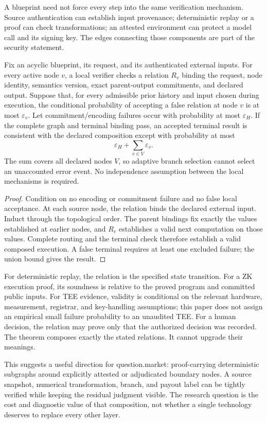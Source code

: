 A blueprint need not force every step into the same verification mechanism. Source authentication can establish input provenance; deterministic replay or a proof can check transformations; an attested environment can protect a model call and its signing key. The edges connecting those components are part of the security statement.

\begin{proposition}
Fix an acyclic blueprint, its request, and its authenticated external inputs. For every active node $v$, a local verifier checks a relation $R_v$ binding the request, node identity, semantics version, exact parent-output commitments, and declared output. Suppose that, for every admissible prior history and input chosen during execution, the conditional probability of accepting a false relation at node $v$ is at most $\varepsilon_v$. Let commitment/encoding failures occur with probability at most $\varepsilon_H$. If the complete graph and terminal binding pass, an accepted terminal result is consistent with the declared composition except with probability at most
\[
\varepsilon_H+\sum_{v\in V}\varepsilon_v.
\]
The sum covers all declared nodes $V$, so adaptive branch selection cannot select an unaccounted error event. No independence assumption between the local mechanisms is required.
\end{proposition}
\begin{proof}
Condition on no encoding or commitment failure and no false local acceptance. At each source node, the relation binds the declared external input. Induct through the topological order. The parent bindings fix exactly the values established at earlier nodes, and $R_v$ establishes a valid next computation on those values. Complete routing and the terminal check therefore establish a valid composed execution. A false terminal requires at least one excluded failure; the union bound gives the result.
\end{proof}

For deterministic replay, the relation is the specified state transition. For a ZK execution proof, its soundness is relative to the proved program and committed public inputs. For TEE evidence, validity is conditional on the relevant hardware, measurement, registrar, and key-handling assumptions; this paper does not assign an empirical small failure probability to an unaudited TEE. For a human decision, the relation may prove only that the authorized decision was recorded. The theorem composes exactly the stated relations. It cannot upgrade their meanings.

This suggests a useful direction for question.market: proof-carrying deterministic subgraphs around explicitly attested or adjudicated boundary nodes. A source snapshot, numerical transformation, branch, and payout label can be tightly verified while keeping the residual judgment visible. The research question is the cost and diagnostic value of that composition, not whether a single technology deserves to replace every other layer.
